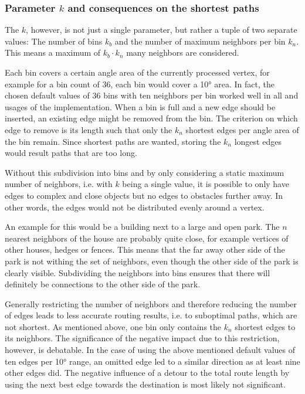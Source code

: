 		\subsubsection{Parameter $k$ and consequences on the shortest paths}
		
			The $k$, however, is not just a single parameter, but rather a tuple of two separate values:
			The number of bins $k_b$ and the number of maximum neighbors per bin $k_n$.
			This means a maximum of $k_b \cdot k_n$ many neighbors are considered.
			
			Each bin covers a certain angle area of the currently processed vertex, for example for a bin count of 36, each bin would cover a 10° area.
			In fact, the chosen default values of 36 bins with ten neighbors per bin worked well in all and usages of the implementation.
			When a bin is full and a new edge should be inserted, an existing edge might be removed from the bin.
			The criterion on which edge to remove is its length such that only the $k_n$ shortest edges per angle area of the bin remain.
			Since shortest paths are wanted, storing the $k_n$ longest edges would result paths that are too long.
			
			Without this subdivision into bins and by only considering a static maximum number of neighbors, i.e. with $k$ being a single value, it is possible to only have edges to complex and close objects but no edges to obstacles further away.
			In other words, the edges would not be distributed evenly around a vertex.
			
			An example for this would be a building next to a large and open park.
			The $n$ nearest neighbors of the house are probably quite close, for example vertices of other houses, hedges or fences.
			This means that the far away other side of the park is not withing the set of neighbors, even though the other side of the park is clearly visible.
			Subdividing the neighbors into bins ensures that there will definitely be connections to the other side of the park.
			
			Generally restricting the number of neighbors and therefore reducing the number of edges leads to less accurate routing results, i.e. to suboptimal paths, which are not shortest.
			As mentioned above, one bin only contains the $k_n$ shortest edges to its neighbors.
			The significance of the negative impact due to this restriction, however, is debatable.
			In the case of using the above mentioned default values of ten edges per 10° range, an omitted edge led to a similar direction as at least nine other edges did.
			The negative influence of a detour to the total route length by using the next best edge towards the destination is most likely not significant.
			
